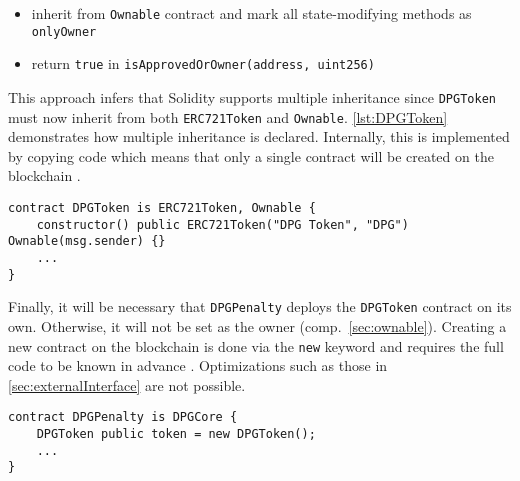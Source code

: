 \begin{itemize}
  \item inherit from \texttt{Ownable} contract and mark all state-modifying methods as \texttt{onlyOwner}
  \item return \texttt{true} in \texttt{isApprovedOrOwner(address, uint256)}
\end{itemize}

This approach infers that Solidity supports multiple inheritance since \texttt{DPGToken} must now inherit from both \texttt{ERC721Token} and \texttt{Ownable}. \autoref{lst:DPGToken} demonstrates how multiple inheritance is declared. Internally, this is implemented by copying code which means that only a single contract will be created on the blockchain \cite[p.~88]{solidityDocs}. 

\begin{lstlisting}[language=Solidity, caption=Multiple inheritance by DPGToken, label=lst:DPGToken]
contract DPGToken is ERC721Token, Ownable {
	constructor() public ERC721Token("DPG Token", "DPG") Ownable(msg.sender) {}
	...
}
\end{lstlisting}

Finally, it will be necessary that \texttt{DPGPenalty} deploys the \texttt{DPGToken} contract on its own. Otherwise, it will not be set as the owner (comp.~\ref{sec:ownable}). Creating a new contract on the blockchain is done via the \texttt{new} keyword and requires the full code to be known in advance \cite[p.~71]{solidityDocs}. Optimizations such as those in \autoref{sec:externalInterface} are not possible. 

\begin{lstlisting}[language=Solidity, caption=Creating a contract from a contract, label=lst:DPGTokenCreation]
contract DPGPenalty is DPGCore {
	DPGToken public token = new DPGToken();
	...
}
\end{lstlisting}



